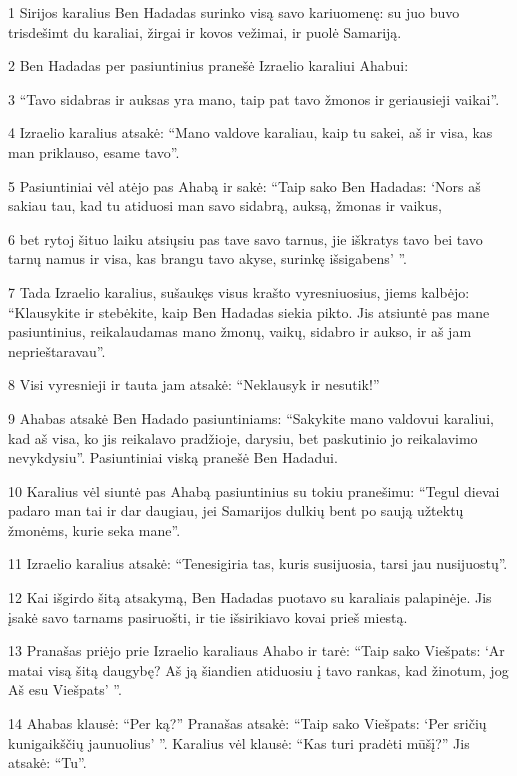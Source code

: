 \par 1 Sirijos karalius Ben Hadadas surinko visą savo kariuomenę: su juo buvo trisdešimt du karaliai, žirgai ir kovos vežimai, ir puolė Samariją. 
\par 2 Ben Hadadas per pasiuntinius pranešė Izraelio karaliui Ahabui: 
\par 3 “Tavo sidabras ir auksas yra mano, taip pat tavo žmonos ir geriausieji vaikai”. 
\par 4 Izraelio karalius atsakė: “Mano valdove karaliau, kaip tu sakei, aš ir visa, kas man priklauso, esame tavo”. 
\par 5 Pasiuntiniai vėl atėjo pas Ahabą ir sakė: “Taip sako Ben Hadadas: ‘Nors aš sakiau tau, kad tu atiduosi man savo sidabrą, auksą, žmonas ir vaikus, 
\par 6 bet rytoj šituo laiku atsiųsiu pas tave savo tarnus, jie iškratys tavo bei tavo tarnų namus ir visa, kas brangu tavo akyse, surinkę išsigabens’ ”. 
\par 7 Tada Izraelio karalius, sušaukęs visus krašto vyresniuosius, jiems kalbėjo: “Klausykite ir stebėkite, kaip Ben Hadadas siekia pikto. Jis atsiuntė pas mane pasiuntinius, reikalaudamas mano žmonų, vaikų, sidabro ir aukso, ir aš jam neprieštaravau”. 
\par 8 Visi vyresnieji ir tauta jam atsakė: “Neklausyk ir nesutik!” 
\par 9 Ahabas atsakė Ben Hadado pasiuntiniams: “Sakykite mano valdovui karaliui, kad aš visa, ko jis reikalavo pradžioje, darysiu, bet paskutinio jo reikalavimo nevykdysiu”. Pasiuntiniai viską pranešė Ben Hadadui. 
\par 10 Karalius vėl siuntė pas Ahabą pasiuntinius su tokiu pranešimu: “Tegul dievai padaro man tai ir dar daugiau, jei Samarijos dulkių bent po saują užtektų žmonėms, kurie seka mane”. 
\par 11 Izraelio karalius atsakė: “Tenesigiria tas, kuris susijuosia, tarsi jau nusijuostų”. 
\par 12 Kai išgirdo šitą atsakymą, Ben Hadadas puotavo su karaliais palapinėje. Jis įsakė savo tarnams pasiruošti, ir tie išsirikiavo kovai prieš miestą. 
\par 13 Pranašas priėjo prie Izraelio karaliaus Ahabo ir tarė: “Taip sako Viešpats: ‘Ar matai visą šitą daugybę? Aš ją šiandien atiduosiu į tavo rankas, kad žinotum, jog Aš esu Viešpats’ ”. 
\par 14 Ahabas klausė: “Per ką?” Pranašas atsakė: “Taip sako Viešpats: ‘Per sričių kunigaikščių jaunuolius’ ”. Karalius vėl klausė: “Kas turi pradėti mūšį?” Jis atsakė: “Tu”. 
